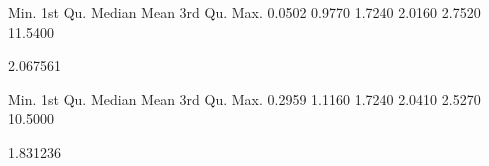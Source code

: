 \begin{Schunk}
\begin{Soutput}
   Min. 1st Qu.  Median    Mean 3rd Qu.    Max. 
 0.0502  0.9770  1.7240  2.0160  2.7520 11.5400 
\end{Soutput}
\begin{Soutput}
[1] 2.067561
\end{Soutput}
\begin{Soutput}
   Min. 1st Qu.  Median    Mean 3rd Qu.    Max. 
 0.2959  1.1160  1.7240  2.0410  2.5270 10.5000 
\end{Soutput}
\begin{Soutput}
[1] 1.831236
\end{Soutput}
\end{Schunk}
